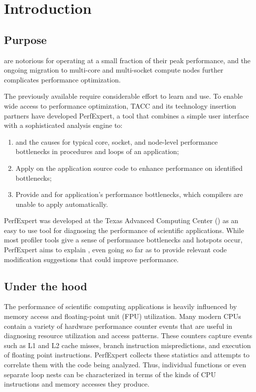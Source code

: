 \chapter{Introduction}
\label{ch:ch01_introduction}
\section{Purpose}
\label{sec:Purpose}

 are notorious for operating at a small fraction of their peak performance, and the ongoing migration to multi-core and multi-socket compute nodes further complicates performance optimization.

The previously available  require considerable effort to learn and use. To enable wide access to performance optimization, TACC and its technology insertion partners have developed PerfExpert, a tool that combines a simple user interface with a sophisticated analysis engine to:

\begin{enumerate}
  \item  {} and  the causes for typical core, socket, and node-level performance bottlenecks in procedures and loops of an application;
  \item  Apply  on the application source code to enhance performance on identified bottlenecks;
  \item  Provide  and for application's performance bottlenecks, which compilers are unable to apply automatically.
\end{enumerate}

PerfExpert was developed at the Texas Advanced Computing Center () as an easy to use tool for diagnosing the performance of scientific applications. While most profiler tools give a sense of  performance bottlenecks and hotspots occur, PerfExpert aims to explain , even going so far as to provide relevant code modification suggestions that could improve performance.

\section{Under the hood}
\label{sec:Under_the_hood}

The performance of scientific computing applications is heavily influenced by memory access and floating-point unit (FPU) utilization. Many modern CPUs contain a variety of hardware performance counter events that are useful in diagnosing resource utilization and access patterns. These counters capture events such as L1 and L2 cache misses, branch instruction mispredictions, and execution of floating point instructions. PerfExpert collects these statistics and attempts to correlate them with the code being analyzed. Thus, individual functions or even separate loop nests can be characterized in terms of the kinds of CPU instructions and memory accesses they produce.


